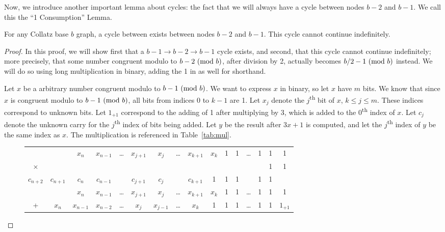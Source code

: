 Now, we introduce another important lemma about cycles: the fact that we will always have a cycle between nodes $b-2$ and $b-1$. We call this the ``1 Consumption'' Lemma.
\begin{lemma}
\label{lem:oneConsumption}
 For any Collatz base $b$ graph, a cycle between exists between nodes $b-2$ and $b-1$. This cycle cannot continue indefinitely.
\end{lemma}
\begin{proof}
In this proof, we will show first that a $b-1 \rightarrow b-2 \rightarrow b-1$ cycle exists, and second, that this cycle cannot continue indefinitely; more precisely, that some number congruent modulo to $b-2 \ (\mathrm{mod}\ b)$, after division by 2, actually becomes $b/2-1 \ (\mathrm{mod}\ b)$ instead. We will do so using long multiplication in binary, adding the 1 in as well for shorthand. \par
Let $x$ be a arbitrary number congruent modulo to $b-1 \ (\mathrm{mod}\ b)$. We want to express $x$ in binary, so let $x$ have $m$ bits. We know that since $x$ is congruent modulo to $b-1 \ (\mathrm{mod}\ b)$, all bits from indices 0 to $k-1$ are 1. Let $x_j$ denote the $j$\textsuperscript{th} bit of $x$, $k \leq j \leq m$. These indices correspond to unknown bits. Let $1_{+1}$ correspond to the adding of 1 after multiplying by 3, which is added to the 0\textsuperscript{th} index of $x$. Let $c_j$ denote the unknown carry for the $j$\textsuperscript{th} index of bits being added. Let $y$ be the result after $3x+1$ is computed, and let the $j$\textsuperscript{th} index of $y$ be the same index as $x$. The multiplication is referenced in Table~\ref{tab:mul}. \par
\begin{figure}
\begin{tabular}{*{16}c}%
 & & $ x_{n}$  & $ x_{n-1}$  & \ldots & $ x_{j+1}$  & $ x_{j}$  & \ldots & $ x_{k+1}$  & $ x_{k}$  & 1 & 1 & \ldots & 1 & 1 & 1 \\
$\times$ & & & & & & & & & & & & & & 1 & 1 \\
\hline
\tiny ${\scriptscriptstyle c_{n+2}}$ & ${\scriptscriptstyle c_{n+1}}$ & ${\scriptscriptstyle c_{n}}$ & ${\scriptscriptstyle c_{n-1}}$ & & ${\scriptscriptstyle c_{j+1}}$ & ${\scriptscriptstyle c_{j}}$ & & ${\scriptscriptstyle c_{k+1}}$ & \tiny 1 & \tiny 1 &  \tiny 1 & &  \tiny 1 & \tiny 1 & \\
  & & $ x_{n}$  & $ x_{n-1}$  & \ldots & $ x_{j+1}$  & $ x_{j}$  & \ldots & $ x_{k+1}$  & $ x_{k}$  & 1 & 1 & \ldots & 1 & 1 & 1 \\
  + & $ x_{n}$  & $ x_{n-1}$  & $ x_{n-2}$  & \ldots & $ x_{j}$  & $ x_{j-1}$  & \ldots & $ x_{k}$  & 1 & 1 & 1 & \ldots & 1 & 1 & $1_{+1}$  \\

\end{tabular}
\end{figure}
\end{proof}
